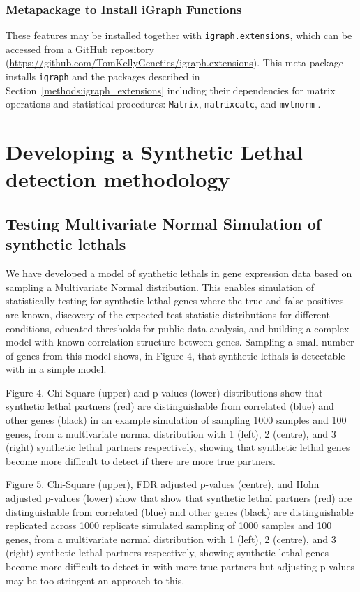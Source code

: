\subsubsection{Metapackage to Install iGraph Functions}
These features may be installed together with \texttt{igraph.extensions}, which can be accessed from a \href{https://github.com/TomKellyGenetics/igraph.extensions}{GitHub repository} (\url{https://github.com/TomKellyGenetics/igraph.extensions}). This meta-package installs \texttt{igraph} \citep{igraph} and the packages described in Section~\ref{methods:igraph_extensions} including their dependencies for matrix operations and statistical procedures: \texttt{Matrix}, \texttt{matrixcalc}, and \texttt{mvtnorm} \citep{Matrix, matrixcalc, Genz2009, mvtnorm}.


\iffalse
\section{Developing a Synthetic Lethal detection methodology}

\subsection{Testing Multivariate Normal Simulation of \Glspl{synthetic lethal}}

We have developed a model of \glspl{synthetic lethal} in \gls{gene expression} data based on sampling a Multivariate Normal distribution.  This enables simulation of statistically testing for \gls{synthetic lethal} genes where the true and false positives are known, discovery of the expected test statistic distributions for different conditions, educated thresholds for public data analysis, and building a complex model with known correlation structure between genes.  Sampling a small number of genes from this model shows, in Figure 4, that \glspl{synthetic lethal} is detectable with in a simple model.

Figure 4.  Chi-Square (upper) and p-values (lower) distributions show that \gls{synthetic lethal} partners (red) are distinguishable from correlated (blue) and other genes (black) in an example simulation of sampling 1000 samples and 100 genes, from a multivariate normal distribution with 1 (left), 2 (centre), and 3 (right) \gls{synthetic lethal} partners respectively, showing that \gls{synthetic lethal} genes become more difficult to detect if there are more true partners.

Figure 5.  Chi-Square (upper), \gls{FDR} adjusted p-values (centre), and Holm adjusted p-values (lower) show that show that \gls{synthetic lethal} partners (red) are distinguishable from correlated (blue) and other genes (black) are distinguishable replicated across 1000 replicate simulated sampling of 1000 samples and 100 genes, from a multivariate normal distribution with 1 (left), 2 (centre), and 3 (right) \gls{synthetic lethal} partners respectively, showing \gls{synthetic lethal} genes become more difficult to detect in with more true partners but adjusting p-values may be too stringent an approach to this.

